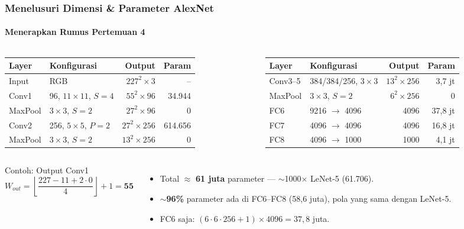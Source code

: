 \documentclass[t,aspectratio=169,xcolor=dvipsnames]{beamer}
\begin{document}
\begin{frame}
    \frametitle{Menelusuri Dimensi \& Parameter AlexNet}
    \framesubtitle{Menerapkan Rumus Pertemuan 4}
    \footnotesize
    \vspace{2pt}
    \begin{columns}[T]
        \scriptsize\setlength{\tabcolsep}{3.5pt}
        \begin{tabular}{llrr}
            \toprule
            \textbf{Layer} & \textbf{Konfigurasi} & \textbf{Output} & \textbf{Param} \\
            \midrule
            Input & RGB & $227^2\times3$ & -- \\
            Conv1 & 96, $11\times11$, $S{=}4$ & $55^2\times96$ & 34.944 \\
            MaxPool & $3\times3$, $S{=}2$ & $27^2\times96$ & 0 \\
            Conv2 & 256, $5\times5$, $P{=}2$ & $27^2\times256$ & 614.656 \\
            MaxPool & $3\times3$, $S{=}2$ & $13^2\times256$ & 0 \\
            \bottomrule
        \end{tabular}
        \scriptsize\setlength{\tabcolsep}{3.5pt}
        \begin{tabular}{llrr}
            \toprule
            \textbf{Layer} & \textbf{Konfigurasi} & \textbf{Output} & \textbf{Param} \\
            \midrule
            Conv3--5 & 384/384/256, $3{\times}3$ & $13^2\times256$ & 3,7 jt \\
            MaxPool & $3\times3$, $S{=}2$ & $6^2\times256$ & 0 \\
            FC6 & 9216 $\to$ 4096 & 4096 & 37,8 jt \\
            FC7 & 4096 $\to$ 4096 & 4096 & 16,8 jt \\
            FC8 & 4096 $\to$ 1000 & 1000 & 4,1 jt \\
            \bottomrule
        \end{tabular}
    \end{columns}
    \vspace{0.3cm}
    \begin{columns}[T]
        \begin{exampleblock}{Contoh: Output Conv1}
            $$W_{out}=\left\lfloor\frac{227-11+2\cdot0}{4}\right\rfloor+1=\mathbf{55}$$
        \end{exampleblock}
        \begin{itemize}
            \item Total $\approx$ \textbf{61 juta} parameter --- $\sim$1000$\times$ LeNet-5 (61.706).
            \item \textbf{$\sim$96\%} parameter ada di FC6--FC8 (58,6 juta), pola yang sama dengan LeNet-5.
            \item FC6 saja: $(6\cdot6\cdot256+1)\times4096 = 37{,}8$ juta.
        \end{itemize}
    \end{columns}
\end{frame}
\end{document}

